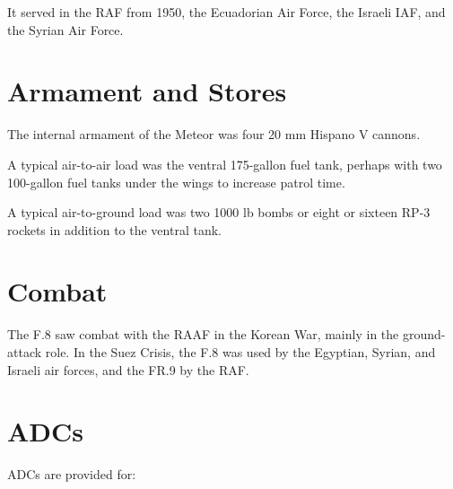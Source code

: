 It served in the RAF from 1950, the Ecuadorian Air Force, the Israeli IAF, and the Syrian Air Force.%


\section{Armament and Stores}

The internal armament of the Meteor was four 20 mm Hispano V cannons.%

A typical air-to-air load was the ventral 175-gallon fuel tank, perhaps with two 100-gallon fuel tanks under the wings to increase patrol time.%

A typical air-to-ground load was two 1000 lb bombs or eight or sixteen RP-3 rockets in addition to the ventral tank.%

\section{Combat}

The F.8 saw combat with the RAAF in the Korean War, mainly in the ground-attack role. In the Suez Crisis, the F.8 was used by the Egyptian, Syrian, and Israeli air forces, and the FR.9 by the RAF.

\section{ADCs}

ADCs are provided for:
\begin{adclist}
\end{adclist}

\listofnotes

